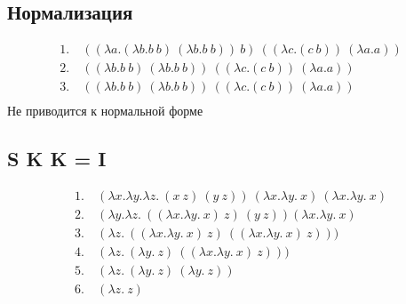 \documentclass{article}
\begin{document}
\section*{}
\subsection*{Нормализация}

\begin{align*}
1.\ & ((\lambda a.(\lambda b.b\ b)\ (\lambda b.b\ b))\ b)\ ((\lambda c.(c\ b))\ (\lambda a.a)) \\
2.\ & ((\lambda b.b\ b)\ (\lambda b.b\ b))\ ((\lambda c.(c\ b))\ (\lambda a.a)) \\
3.\ & ((\lambda b.b\ b)\ (\lambda b.b\ b))\ ((\lambda c.(c\ b))\ (\lambda a.a)) \\
\end{align*}
Не приводится к нормальной форме

\subsection*{S K K = I}
\begin{align*}
1.\ & (\lambda x.\lambda y.\lambda z.\ (x\ z)\ (y\ z))\ (\lambda x.\lambda y.\ x)\ (\lambda x.\lambda y.\ x) \\
2.\ & (\lambda y.\lambda z.\ ((\lambda x.\lambda y.\ x)\ z)\ (y\ z))(\lambda x.\lambda y.\ x)  \\
3.\ & (\lambda z.\ ((\lambda x.\lambda y.\ x)\ z)\ ((\lambda x.\lambda y.\ x)\ z)))  \\
4.\ & (\lambda z.\ (\lambda y.\ z)\ ((\lambda x.\lambda y.\ x)\ z)))  \\
5.\ & (\lambda z.\ (\lambda y.\ z)\  (\lambda y.\ z))  \\
6.\ & (\lambda z.\ z)  \\

\end{align*}
\end{document}
